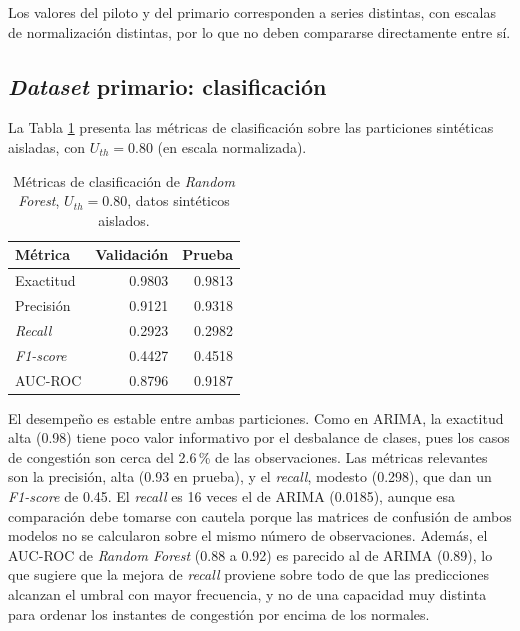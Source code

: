 \documentclass[12pt]{report}
\begin{document}
Los valores del piloto y del primario corresponden a series distintas, con escalas de normalización distintas, por lo que no deben compararse directamente entre sí.

\subsection*{\textit{Dataset} primario: clasificación}

La Tabla \ref{tab:rf_primario_clasificacion} presenta las métricas de clasificación sobre las particiones sintéticas aisladas, con $U_{th}=0.80$ (en escala normalizada).

\begin{table}[H]
    \centering
    \begin{tabular}{|l|r|r|}
        \hline
        \textbf{Métrica} & \textbf{Validación} & \textbf{Prueba} \\
        \hline
        Exactitud & 0.9803 & 0.9813 \\
        Precisión & 0.9121 & 0.9318 \\
        \textit{Recall} & 0.2923 & 0.2982 \\
        \textit{F1-score} & 0.4427 & 0.4518 \\
        AUC-ROC & 0.8796 & 0.9187 \\
        \hline
    \end{tabular}
    \caption{Métricas de clasificación de \textit{Random Forest}, $U_{th}=0.80$, datos sintéticos aislados.}
    \label{tab:rf_primario_clasificacion}
\end{table}

El desempeño es estable entre ambas particiones. Como en ARIMA, la exactitud alta (0.98) tiene poco valor informativo por el desbalance de clases, pues los casos de congestión son cerca del 2.6\,\% de las observaciones. Las métricas relevantes son la precisión, alta (0.93 en prueba), y el \textit{recall}, modesto (0.298), que dan un \textit{F1-score} de 0.45. El \textit{recall} es 16 veces el de ARIMA (0.0185), aunque esa comparación debe tomarse con cautela porque las matrices de confusión de ambos modelos no se calcularon sobre el mismo número de observaciones. Además, el AUC-ROC de \textit{Random Forest} (0.88 a 0.92) es parecido al de ARIMA (0.89), lo que sugiere que la mejora de \textit{recall} proviene sobre todo de que las predicciones alcanzan el umbral con mayor frecuencia, y no de una capacidad muy distinta para ordenar los instantes de congestión por encima de los normales.
\end{document}
